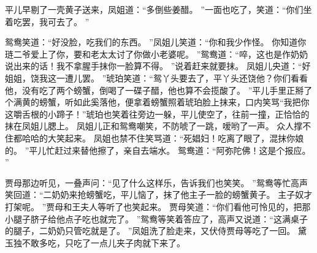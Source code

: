 平儿早剔了一壳黄子送来，凤姐道：“多倒些姜醋。
”一面也吃了，笑道：“你们坐着吃罢，我可去了。
”\par
鸳鸯笑道：“好没脸，吃我们的东西。
”凤姐儿笑道：“你和我少作怪。
你知道你琏二爷爱上了你，要和老太太讨了你做小老婆呢。
”鸳鸯道：“啐，这也是作奶奶说出来的话！我不拿腥手抹你一脸算不得。
”说着赶来就要抹。
凤姐儿央道：“好姐姐，饶我这一遭儿罢。
”琥珀笑道：“鸳丫头要去了，平丫头还饶他？你们看看他，没有吃了两个螃蟹，倒喝了一碟子醋，他也算不会揽酸了。
”平儿手里正掰了个满黄的螃蟹，听如此奚落他，便拿着螃蟹照着琥珀脸上抹来，口内笑骂“我把你这嚼舌根的小蹄子！”琥珀也笑着往旁边一躲，平儿使空了，往前一撞，正恰恰的抹在凤姐儿腮上。
凤姐儿正和鸳鸯嘲笑，不防唬了一跳，嗳哟了一声。
众人撑不住都哈哈的大笑起来。
凤姐也禁不住笑骂道：“死娼妇！吃离了眼了，混抹你娘的。
”平儿忙赶过来替他擦了，亲自去端水。
鸳鸯道：“阿弥陀佛！这是个报应。
”\par
贾母那边听见，一叠声问：“见了什么这样乐，告诉我们也笑笑。
”鸳鸯等忙高声笑回道：“二奶奶来抢螃蟹吃，平儿恼了，抹了他主子一脸的螃蟹黄子。
主子奴才打架呢。
”贾母和王夫人等听了也笑起来。
贾母笑道：“你们看他可怜见的，把那小腿子脐子给他点子吃也就完了。
”鸳鸯等笑着答应了，高声又说道：“这满桌子的腿子，二奶奶只管吃就是了。
”凤姐洗了脸走来，又伏侍贾母等吃了一回。
黛玉独不敢多吃，只吃了一点儿夹子肉就下来了。
\par


